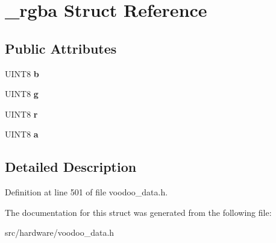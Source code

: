\hypertarget{struct__rgba}{\section{\-\_\-rgba Struct Reference}
\label{struct__rgba}
}
\subsection*{Public Attributes}
\begin{DoxyCompactItemize}
\item 
\hypertarget{struct__rgba_a9beda6f3a6c9f89fd354d5d322696a41}{U\-I\-N\-T8 {\bfseries b}}\label{struct__rgba_a9beda6f3a6c9f89fd354d5d322696a41}

\item 
\hypertarget{struct__rgba_acb2cb9901aeb26dccd5a4735b367c665}{U\-I\-N\-T8 {\bfseries g}}\label{struct__rgba_acb2cb9901aeb26dccd5a4735b367c665}

\item 
\hypertarget{struct__rgba_a954228f57987281eef6280cb156bb3bd}{U\-I\-N\-T8 {\bfseries r}}\label{struct__rgba_a954228f57987281eef6280cb156bb3bd}

\item 
\hypertarget{struct__rgba_a29db039a53ec497c40b6f9f11161f7b5}{U\-I\-N\-T8 {\bfseries a}}\label{struct__rgba_a29db039a53ec497c40b6f9f11161f7b5}

\end{DoxyCompactItemize}


\subsection{Detailed Description}


Definition at line 501 of file voodoo\-\_\-data.\-h.



The documentation for this struct was generated from the following file\-:\begin{DoxyCompactItemize}
\item 
src/hardware/voodoo\-\_\-data.\-h\end{DoxyCompactItemize}
